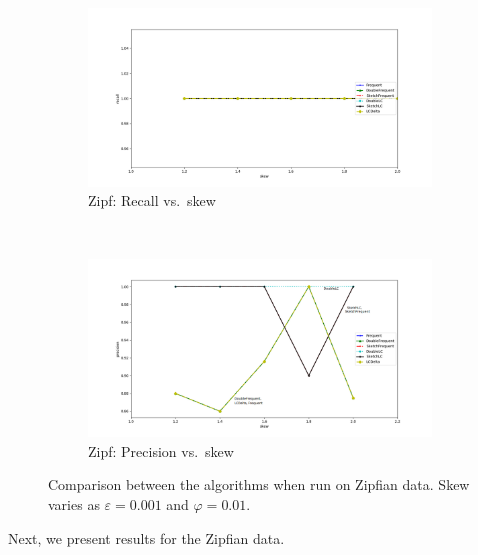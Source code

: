 \documentclass[sigconf,review=true,anonymous=true,screen]{acmart}
\newcommand{\eps}{\varepsilon}
\renewcommand{\phi}{\varphi}
\begin{document}
\begin{figure}[b]
\begin{subfigure}[b]{0.3\textwidth}
\includegraphics[width=\textwidth]{../Plots/recall_skew.png}
\caption{Zipf: Recall vs.~skew}
\end{subfigure}
~
\begin{subfigure}[b]{0.3\textwidth}
\includegraphics[width=\textwidth]{../Plots/precision_skew.png}
\caption{Zipf: Precision vs.~skew}
\end{subfigure}
\caption{Comparison between the algorithms when run on Zipfian data. Skew varies as $\eps = 0.001$ and $\phi = 0.01$.}
\end{figure}

Next, we present results for the Zipfian data. 
\end{document}
